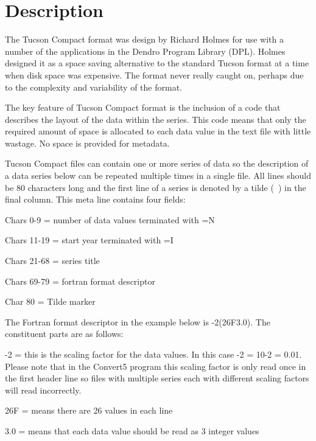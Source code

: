 \documentclass[10pt, headsepline,DIV14,BCOR0.5cm]{scrreprt}
\begin{document}
\section{Description}


The Tucson Compact format was design by Richard Holmes for use with a number of the applications in the Dendro Program Library (DPL). Holmes designed it as a space saving alternative to the standard Tucson format at a time when disk space was expensive. The format never really caught on, perhaps due to the complexity and variability of the format.

The key feature of Tucson Compact format is the inclusion of a code that describes the layout of the data within the series. This code means that only the required amount of space is allocated to each data value in the text file with little wastage. No space is provided for metadata.

Tucson Compact files can contain one or more series of data so the description of a data series below can be repeated multiple times in a single file. All lines should be 80 characters long and the first line of a series is denoted by a tilde (~) in the final column. This meta line contains four fields:

\begin{itemize*}
    \item  Chars 0-9 = number of data values terminated with =N
    \item  Chars 11-19 = start year terminated with =I
    \item  Chars 21-68 = series title
    \item  Chars 69-79 = fortran format descriptor
    \item  Char 80 = Tilde marker 
\end{itemize*}

The Fortran format descriptor in the example below is -2(26F3.0). The constituent parts are as follows:

\begin{itemize*}
    \item  -2 = this is the scaling factor for the data values. In this case -2 = 10-2 = 0.01. Please note that in the Convert5 program this scaling factor is only read once in the first header line so files with multiple series each with different scaling factors will read incorrectly. 
    \item  26F = means there are 26 values in each line
    \item  3.0 = means that each data value should be read as 3 integer values 
\end{itemize*}
\end{document}

